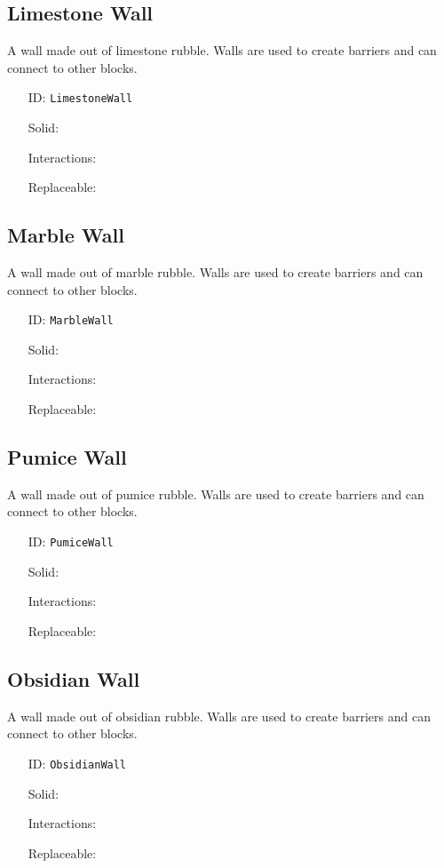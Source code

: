 \subsection{Limestone Wall}\label{subsec:blocks_limestone wall}
A wall made out of limestone rubble.
                Walls are used to create barriers and can connect to other blocks.
\newline
\begin{itemize}[nosep]
\item[ID:] \texttt{LimestoneWall}
\item[Solid:]  \Checkmark \item[Interactions:]  \XSolidBrush \item[Replaceable:]  \XSolidBrush \end{itemize}

\subsection{Marble Wall}\label{subsec:blocks_marble wall}
A wall made out of marble rubble.
                Walls are used to create barriers and can connect to other blocks.
\newline
\begin{itemize}[nosep]
\item[ID:] \texttt{MarbleWall}
\item[Solid:]  \Checkmark \item[Interactions:]  \XSolidBrush \item[Replaceable:]  \XSolidBrush \end{itemize}

\subsection{Pumice Wall}\label{subsec:blocks_pumice wall}
A wall made out of pumice rubble.
                Walls are used to create barriers and can connect to other blocks.
\newline
\begin{itemize}[nosep]
\item[ID:] \texttt{PumiceWall}
\item[Solid:]  \Checkmark \item[Interactions:]  \XSolidBrush \item[Replaceable:]  \XSolidBrush \end{itemize}

\subsection{Obsidian Wall}\label{subsec:blocks_obsidian wall}
A wall made out of obsidian rubble.
                Walls are used to create barriers and can connect to other blocks.
\newline
\begin{itemize}[nosep]
\item[ID:] \texttt{ObsidianWall}
\item[Solid:]  \Checkmark \item[Interactions:]  \XSolidBrush \item[Replaceable:]  \XSolidBrush \end{itemize}

